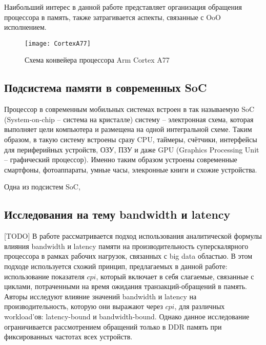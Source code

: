     Наибольший интерес в данной работе представляет организация обращения процессора в память,
    также затрагивается аспекты, связанные с OoO исполнением.

    \begin{figure}[!h]
        \caption{Схема конвейера процессора Arm Cortex A77 \cite{CortexA77Docs}}
        \centering
        \texttt{[image: CortexA77]}
        \label{cortexA77}
    \end{figure}

\subsection{Подсистема памяти в современных SoC}

    Процессор в современным мобильных системах встроен в так называемую SoC (System-on-chip --
    система на кристалле) систему -- электронная схема, которая выполняет цели компьютера
    и размещена на одной интегральной схеме. Таким образом, в такую систему встроены сразу CPU,
    таймеры, счётчики, интерфейсы для периферийных устройств, ОЗУ, ПЗУ и даже GPU
    (Graphics Processing Unit -- графический процессор). Именно таким образом устроены современные
    смартфоны, фотоаппараты, умные часы, элекронные книги и схожие устройства.

    Одна из подсистем SoC,

\subsection{Исследования на тему bandwidth и latency}

    [TODO] В работе \cite{clapp2015quantifying} рассматривается подход использования аналитической
    формулы влияния bandwidth и latency памяти на производительность суперскалярного
    процессора в рамках рабочих нагрузок, связанных с big data областью. В этом подходе
    используется схожий принцип, предлагаемых в данной работе: использование показателя
    $cpi$, который включает в себя слагаемые, связанные с циклами, потраченными на время
    ожидания транзакций-обращений в память. Авторы исследуют влияние значений bandwidth
    и latency на производительность, которую они выражают через $cpi$, для различных workload'ов:
    latency-bound и bandwidth-bound. Однако данное исследование ограничивается
    рассмотрением обращений только в DDR память при фиксированных частотах всех устройств.

